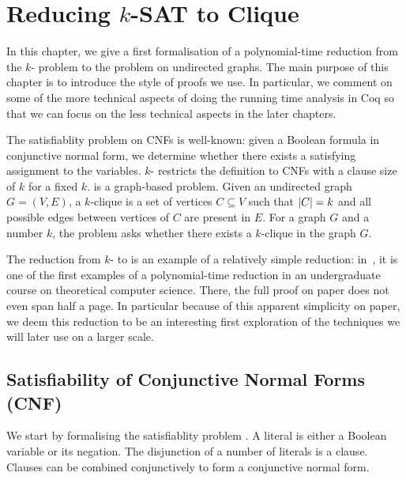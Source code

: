 \newcommand{\varBound}{\textsf{varBound}}
\newcommand{\maxVar}{\textsf{maxVar}}

\chapter{Reducing $k$-SAT to Clique}\label{chap:ksat_clique}
In this chapter, we give a first formalisation of a polynomial-time reduction from the $k$-\SAT{} problem to the \Clique{} problem on undirected graphs. The main purpose of this chapter is to introduce the style of proofs we use. In particular, we comment on some of the more technical aspects of doing the running time analysis in Coq so that we can focus on the less technical aspects in the later chapters. 

The satisfiablity problem \SAT{} on CNFs is well-known: given a Boolean formula in conjunctive normal form, we determine whether there exists a satisfying assignment to the variables. $k$-\SAT{} restricts the definition to CNFs with a clause size of $k$ for a fixed $k$.
\Clique{} is a graph-based problem. Given an undirected graph $G = (V, E)$, a $k$-clique is a set of vertices $C \subseteq V$ such that $|C| = k$ and all possible edges between vertices of $C$ are present in $E$. For a graph $G$ and a number $k$, the \Clique{} problem asks whether there exists a $k$-clique in the graph $G$. 

The reduction from $k$-\SAT{} to \Clique{} is an example of a relatively simple reduction: in~\cite{Bläser:TISkript}, it is one of the first examples of a polynomial-time reduction in an undergraduate course on theoretical computer science. There, the full proof on paper does not even span half a page. 
In particular because of this apparent simplicity on paper, we deem this reduction to be an interesting first exploration of the techniques we will later use on a larger scale.

\section{Satisfiability of Conjunctive Normal Forms (CNF)}\label{sec:sat}
We start by formalising the satisfiablity problem \SAT{}.
A literal is either a Boolean variable or its negation. The disjunction of a number of literals is a clause. Clauses can be combined conjunctively to form a conjunctive normal form. 

